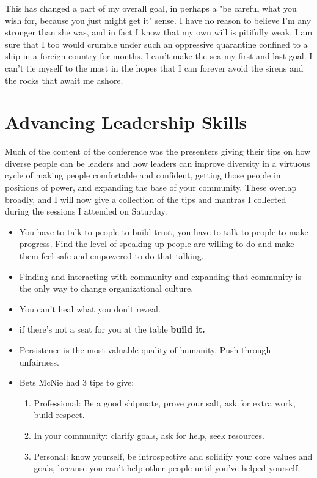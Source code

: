 \documentclass{article}
\begin{document}
This has changed a part of my overall goal, in perhaps a "be careful what you wish for, because you just might get it" sense. I have no reason to believe I'm any stronger than she was, and in fact I know that my own will is pitifully weak. I am sure that I too would crumble under such an oppressive quarantine confined to a ship in a foreign country for months. I can't make the sea my first and last goal. I can't tie myself to the mast in the hopes that I can forever avoid the sirens and the rocks that await me ashore.
\section*{Advancing Leadership Skills}
Much of the content of the conference was the presenters giving their tips on how diverse people can be leaders and how leaders can improve diversity in a virtuous cycle of making people comfortable and confident, getting those people in positions of power, and expanding the base of your community. These overlap broadly, and I will now give a collection of the tips and mantras I collected during the sessions I attended on Saturday. \begin{itemize}
    \item You have to talk to people to build trust, you have to talk to people to make progress. Find the level of speaking up people are willing to do and make them feel safe and empowered to do that talking.
    \item Finding and interacting with community and expanding that community is the only way to change organizational culture.
    \item You can't heal what you don't reveal.
    \item if there's not a seat for you at the table \textbf{build it.}
    \item Persistence is the most valuable quality of humanity. Push through unfairness.
    \item Bets McNie had 3 tips to give:
    \begin{enumerate}
     \item Professional: Be a good shipmate, prove your salt, ask for extra work, build respect.
     \item In your community: clarify goals, ask for help, seek resources.
     \item Personal: know yourself, be introspective and solidify your core values and goals, because you can't help other people until you've helped yourself.
    \end{enumerate}

\end{itemize}
\end{document}
